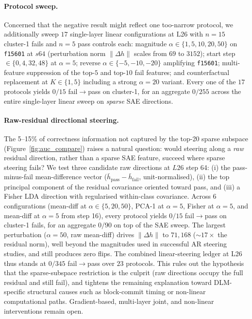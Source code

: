 \documentclass[11pt]{article}
\begin{document}
\paragraph{Protocol sweep.}
Concerned that the negative result might reflect one too-narrow protocol, we additionally sweep $17$ single-layer linear configurations at L26 with $n\!=\!15$ cluster-1 fails and $n\!=\!5$ pass controls each: magnitude $\alpha\!\in\!\{1, 5, 10, 20, 50\}$ on \texttt{f15601} at $s64$ (perturbation norm $\|\Delta h\|$ scales from $69$ to $3152$); start step $\in\!\{0, 4, 32, 48\}$ at $\alpha\!=\!5$; reverse $\alpha\!\in\!\{-5, -10, -20\}$ amplifying \texttt{f15601}; multi-feature suppression of the top-$5$ and top-$10$ fail features; and counterfactual replacement at $K\!\in\!\{1, 5\}$ including a strong $\alpha\!=\!20$ variant.
Every one of the $17$ protocols yields $0/15$ fail$\to$pass on cluster-1, for an aggregate $0/255$ across the entire single-layer linear sweep on \emph{sparse} SAE directions.

\paragraph{Raw-residual directional steering.}
The 5--15\% of correctness information not captured by the top-20 sparse subspace (Figure~\ref{fig:auc_compare}) raises a natural question: would steering along a \emph{raw} residual direction, rather than a sparse SAE feature, succeed where sparse steering fails?
We test three candidate raw directions at $L26$ step 64: (i) the pass-minus-fail mean-difference vector ($\bar h_{\text{pass}} - \bar h_{\text{fail}}$, unit-normalised), (ii) the top principal component of the residual covariance oriented toward pass, and (iii) a Fisher LDA direction with regularised within-class covariance.
Across $6$ configurations (mean-diff at $\alpha\!\in\!\{5, 20, 50\}$, PCA-1 at $\alpha\!=\!5$, Fisher at $\alpha\!=\!5$, and mean-diff at $\alpha\!=\!5$ from step 16), every protocol yields $0/15$ fail$\to$pass on cluster-1 fails, for an aggregate $0/90$ on top of the SAE sweep.
The largest perturbation ($\alpha\!=\!50$, raw mean-diff) drives $\|\Delta h\|$ to $71{,}168$ ($\sim$$17\!\times$ the residual norm), well beyond the magnitudes used in successful AR steering studies, and still produces zero flips.
The combined linear-steering ledger at L26 thus stands at $0/345$ fail$\to$pass over $23$ protocols.
This rules out the hypothesis that the sparse-subspace restriction is the culprit (raw directions occupy the full residual and still fail), and tightens the remaining explanation toward DLM-specific structural causes such as block-commit timing or non-linear computational paths. Gradient-based, multi-layer joint, and non-linear interventions remain open.
\end{document}
